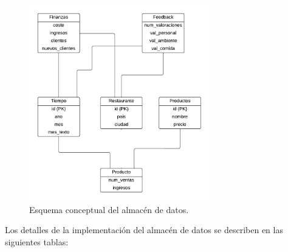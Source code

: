 \documentclass[11pt]{opticajnl}
\begin{document}
\begin{figure}[h]
\centering
\includegraphics[width=0.7\textwidth]{fotos/3.pdf}
\caption{Esquema conceptual del almacén de datos.}
\label{fig:esquema_almacen}
\end{figure}

\noindent Los detalles de la implementación del almacén de datos se describen en las siguientes tablas: 

\newpage
\end{document}

